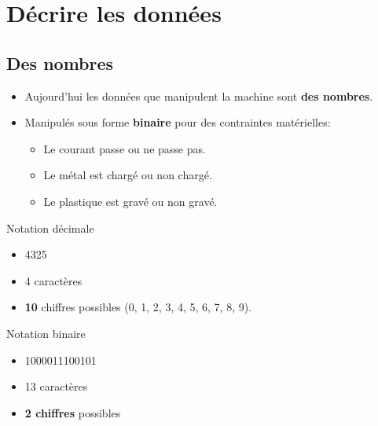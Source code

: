 \section[Décrire]{Décrire les données}
\subsection{Des nombres}

\begin{slide}
	\begin{itemize}
		\item Aujourd'hui les données que manipulent la machine sont \textbf{des nombres}.
		\item Manipulés sous forme \textbf{binaire} pour des contraintes matérielles:
			\begin{itemize}
				\item Le courant passe ou ne passe pas.
				\item Le métal est chargé ou non chargé.
				\item Le plastique est gravé ou non gravé.
			\end{itemize}  
	\end{itemize}
\end{slide}

\begin{slide}
\begin{exampleblock}{Notation décimale}
  \begin{itemize}
    \item 4325
    \item 4 caractères
    \item \textbf{10} chiffres possibles (0, 1, 2, 3, 4, 5, 6, 7, 8, 9).
  \end{itemize}
\end{exampleblock}

\begin{exampleblock}{Notation binaire}
  \begin{itemize}
    \item 1000011100101
    \item 13 caractères
    \item \textbf{2 chiffres} possibles
  \end{itemize}
\end{exampleblock}

\end{slide}



